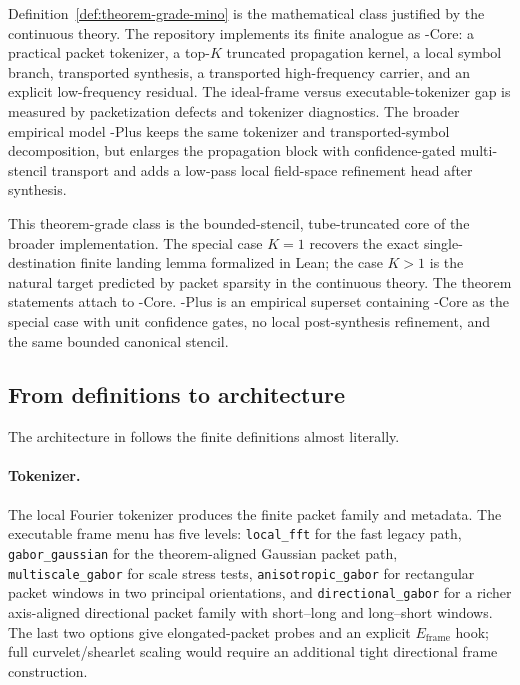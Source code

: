 Definition~\ref{def:theorem-grade-mino} is the mathematical class justified by the continuous theory. The repository implements its finite analogue as \MiNO-Core: a practical packet tokenizer, a top-$K$ truncated propagation kernel, a local symbol branch, transported synthesis, a transported high-frequency carrier, and an explicit low-frequency residual. The ideal-frame versus executable-tokenizer gap is measured by packetization defects and tokenizer diagnostics. The broader empirical model \MiNO-Plus keeps the same tokenizer and transported-symbol decomposition, but enlarges the propagation block with confidence-gated multi-stencil transport and adds a low-pass local field-space refinement head after synthesis.

This theorem-grade class is the bounded-stencil, tube-truncated core of the broader implementation. The special case $K=1$ recovers the exact single-destination finite landing lemma formalized in Lean; the case $K>1$ is the natural target predicted by packet sparsity in the continuous theory. The theorem statements attach to \MiNO-Core. \MiNO-Plus is an empirical superset containing \MiNO-Core as the special case with unit confidence gates, no local post-synthesis refinement, and the same bounded canonical stencil.

\subsection{From definitions to architecture}

The architecture in  follows the finite definitions almost literally.

\paragraph{Tokenizer.}
The local Fourier tokenizer produces the finite packet family and metadata.  The executable frame menu has five levels: \texttt{local\_fft} for the fast legacy path, \texttt{gabor\_gaussian} for the theorem-aligned Gaussian packet path, \texttt{multiscale\_gabor} for scale stress tests, \texttt{anisotropic\_gabor} for rectangular packet windows in two principal orientations, and \texttt{directional\_gabor} for a richer axis-aligned directional packet family with short--long and long--short windows.  The last two options give elongated-packet probes and an explicit $E_{\mathrm{frame}}$ hook; full curvelet/shearlet scaling would require an additional tight directional frame construction.

